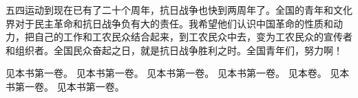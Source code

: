 五四运动到现在已有了二十个周年，抗日战争也快到两周年了。全国的青年和文化界对于民主革命和抗日战争负有大的责任。我希望他们认识中国革命的性质和动力，把自己的工作和工农民众结合起来，到工农民众中去，变为工农民众的宣传者和组织者。全国民众奋起之日，就是抗日战争胜利之时。全国青年们，努力啊！


\begin{maonote}
见本书第一卷。
见本书第一卷。
见本书第一卷。
见本书第一卷。
见本卷。
见本书第一卷。
见本书第一卷。
\end{maonote}
